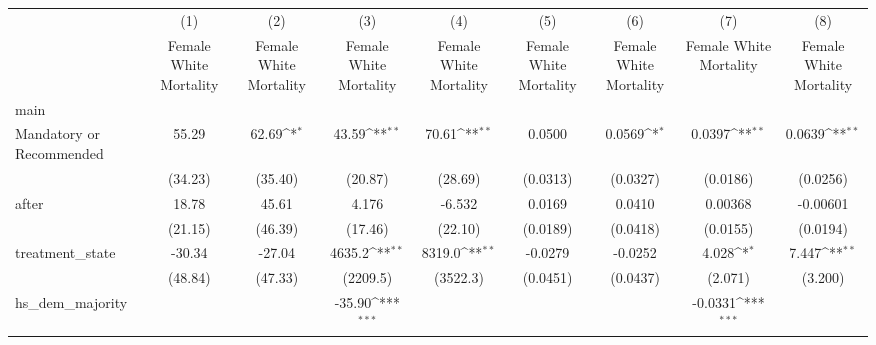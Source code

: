 {
\def\sym#1{\ifmmode^{#1}\else\(^{#1}\)\fi}
\begin{longtable}{l*{8}{c}}
\hline\hline\endfirsthead\hline\endhead\hline\endfoot\endlastfoot
                    &\multicolumn{1}{c}{(1)}&\multicolumn{1}{c}{(2)}&\multicolumn{1}{c}{(3)}&\multicolumn{1}{c}{(4)}&\multicolumn{1}{c}{(5)}&\multicolumn{1}{c}{(6)}&\multicolumn{1}{c}{(7)}&\multicolumn{1}{c}{(8)}\\
                    &\multicolumn{1}{c}{Female White Mortality}&\multicolumn{1}{c}{Female White Mortality}&\multicolumn{1}{c}{Female White Mortality}&\multicolumn{1}{c}{Female White Mortality}&\multicolumn{1}{c}{Female White Mortality}&\multicolumn{1}{c}{Female White Mortality}&\multicolumn{1}{c}{Female White Mortality}&\multicolumn{1}{c}{Female White Mortality}\\
\hline
main                &                     &                     &                     &                     &                     &                     &                     &                     \\
Mandatory or Recommended&       55.29         &       62.69\sym{*}  &       43.59\sym{**} &       70.61\sym{**} &      0.0500         &      0.0569\sym{*}  &      0.0397\sym{**} &      0.0639\sym{**} \\
                    &     (34.23)         &     (35.40)         &     (20.87)         &     (28.69)         &    (0.0313)         &    (0.0327)         &    (0.0186)         &    (0.0256)         \\
[1em]
after               &       18.78         &       45.61         &       4.176         &      -6.532         &      0.0169         &      0.0410         &     0.00368         &    -0.00601         \\
                    &     (21.15)         &     (46.39)         &     (17.46)         &     (22.10)         &    (0.0189)         &    (0.0418)         &    (0.0155)         &    (0.0194)         \\
[1em]
treatment\_state     &      -30.34         &      -27.04         &      4635.2\sym{**} &      8319.0\sym{**} &     -0.0279         &     -0.0252         &       4.028\sym{*}  &       7.447\sym{**} \\
                    &     (48.84)         &     (47.33)         &    (2209.5)         &    (3522.3)         &    (0.0451)         &    (0.0437)         &     (2.071)         &     (3.200)         \\
[1em]
hs\_dem\_majority     &                     &                     &      -35.90\sym{***}&                     &                     &                     &     -0.0331\sym{***}&                     \\

\end{longtable}}
